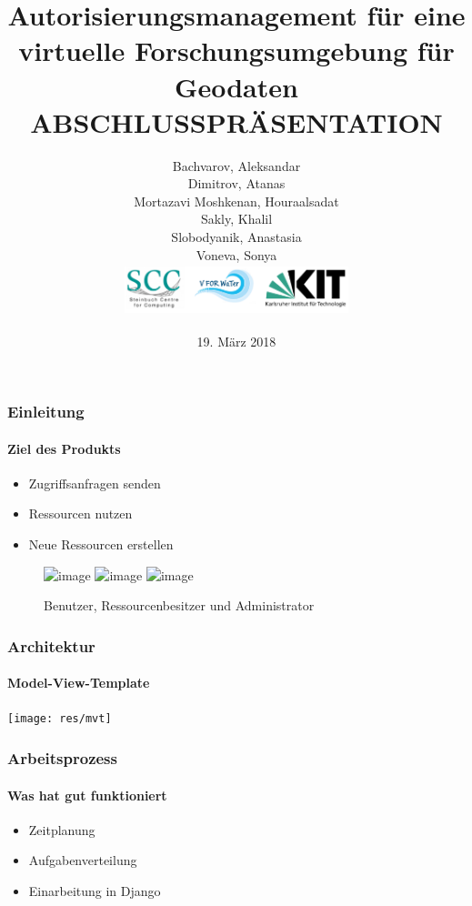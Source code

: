 \documentclass{beamer}
\title[Autorisierungsmanagement für eine virtuelle
Forschungsumgebung für Geodaten: Abschlusspräsentation]{Autorisierungsmanagement für eine virtuelle
Forschungsumgebung für Geodaten \\ \textbf{ABSCHLUSSPRÄSENTATION}} %
\author[]{
Bachvarov, Aleksandar\\
Dimitrov, Atanas\\
Mortazavi Moshkenan, Houraalsadat\\
Sakly, Khalil\\
Slobodyanik, Anastasia\\
Voneva, Sonya\\ \vspace{.75cm}
	\includegraphics[width=6.5cm, height=1.5cm]{res/logos} 
}
\date{19. März 2018} %
\begin{document}
\begin{frame}[plain]
\titlepage %
\end{frame}




\begin{frame}
\frametitle{Einleitung}
\framesubtitle{Ziel des Produkts}

\begin{itemize}
	\item<1-7> Zugriffsanfragen senden
	\item<2-7> Ressourcen nutzen
	\item<3-7> Neue Ressourcen erstellen
\end{itemize}
	\begin{figure}
		
			\includegraphics<4-7>[height=2cm,width=2cm]{res/benutzer}
			\hspace{0.2cm}
			\includegraphics<5-7>[height=2cm,width=2cm]{res/ressbesitzer}
			\hspace{0.2cm}
			\includegraphics<6-7>[height=2cm,width=2cm]{res/admin}	
			\item<7>Benutzer, Ressourcenbesitzer und Administrator
			
	\end{figure}

\end{frame}
\begin{frame}

\frametitle{Architektur}
\framesubtitle{Model-View-Template}
\vspace{1cm}
\texttt{[image: res/mvt]}

\end{frame}
\begin{frame}
\frametitle{Arbeitsprozess}
\framesubtitle{Was hat gut funktioniert}
\begin{itemize}
	\item<1-3> Zeitplanung
	\item<2-3> Aufgabenverteilung
	\item<3> Einarbeitung in Django
\end{itemize}
\end{frame}
\end{document}
